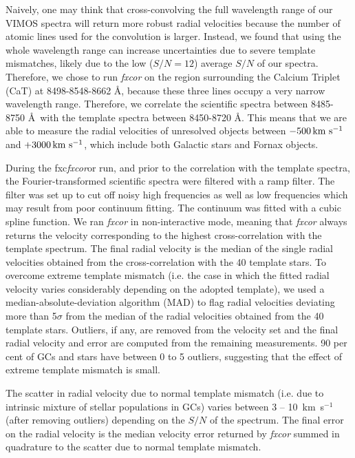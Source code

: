 \documentclass[useAMS,usenatbib]{mn2e}
\newcommand{\kms}{\mbox{\,km~s$^{-1}$}}
\begin{document}
Naively, one may think that cross-convolving the full wavelength range of our VIMOS spectra will return more robust radial velocities because the number of atomic lines used for the convolution is larger. Instead, we found that using the whole wavelength range can increase uncertainties due to severe template mismatches, likely due to the low ($S/N = 12$) average $S/N$ of our spectra. Therefore, we chose to run {\it fxcor} on the region surrounding the Calcium Triplet (CaT) at 8498-8548-8662 \AA , because these three lines occupy a very narrow wavelength range. Therefore, we correlate the scientific spectra between 8485-8750 \AA\ with the template spectra between 8450-8720 \AA . This means that we are able to measure the radial velocities of unresolved objects between $-500 \kms$ and $+3000\kms$, which include both Galactic stars and Fornax objects.   

During the fxc{\it fxcor}or run, and prior to the correlation with the template spectra, the Fourier-transformed scientific spectra were filtered with a ramp filter. The filter was set up to cut off noisy high frequencies as well as low frequencies which may result from poor continuum fitting. The continuum was fitted with a cubic spline function.
We ran {\it fxcor} in non-interactive mode, meaning that {\it fxcor} always returns the velocity corresponding to the highest cross-correlation with the template spectrum. The final radial velocity is the median of the single radial velocities obtained from the cross-correlation with the 40 template stars. %
To overcome extreme template mismatch (i.e. the case in which the fitted radial velocity varies considerably depending on the adopted template), we used a median-absolute-deviation algorithm (MAD) to flag radial velocities deviating more than 5$\sigma$ from the median of the radial velocities obtained from the 40 template stars. Outliers, if any, are removed from the velocity set and the final radial velocity and error are computed from the remaining measurements. 90 per cent of GCs and stars have between 0 to 5 outliers, suggesting that the effect of extreme template mismatch is small. 

The scatter in radial velocity due to normal template mismatch (i.e. due to intrinsic mixture of stellar populations in GCs) varies between 3 -- 10 \kms (after removing outliers) depending on the $S/N$ of the spectrum. The final error on the radial velocity is the median velocity error returned by {\it fxcor} summed in quadrature to the scatter due to normal template mismatch. 
\end{document}
